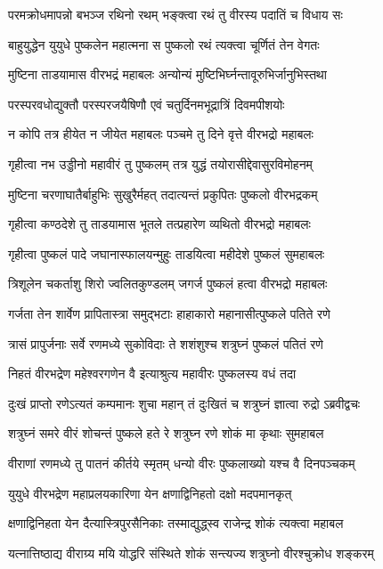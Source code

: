 \twolineshloka
{परमक्रोधमापन्नो बभञ्ज रथिनो रथम्}
{भङ्क्त्वा रथं तु वीरस्य पदातिं च विधाय सः}%

\twolineshloka
{बाहुयुद्धेन युयुधे पुष्कलेन महात्मना}
{स पुष्कलो रथं त्यक्त्वा चूर्णितं तेन वेगतः}%

\twolineshloka
{मुष्टिना ताडयामास वीरभद्रं महाबलः}
{अन्योन्यं मुष्टिभिर्घ्नन्तावूरुभिर्जानुभिस्तथा}%

\twolineshloka
{परस्परवधोद्युक्तौ परस्परजयैषिणौ}
{एवं चतुर्दिनमभूद्रात्रिं दिवमपीशयोः}%

\twolineshloka
{न कोपि तत्र हीयेत न जीयेत महाबलः}
{पञ्चमे तु दिने वृत्ते वीरभद्रो महाबलः}%

\twolineshloka
{गृहीत्वा नभ उड्डीनो महावीरं तु पुष्कलम्}
{तत्र युद्धं तयोरासीद्देवासुरविमोहनम्}%

\twolineshloka
{मुष्टिना चरणाघातैर्बाहुभिः सुखुरैर्महत्}
{तदात्यन्तं प्रकुपितः पुष्कलो वीरभद्रकम्}%

\twolineshloka
{गृहीत्वा कण्ठदेशे तु ताडयामास भूतले}
{तत्प्रहारेण व्यथितो वीरभद्रो महाबलः}%

\twolineshloka
{गृहीत्वा पुष्कलं पादे जघानास्फालयन्मुहुः}
{ताडयित्वा महीदेशे पुष्कलं सुमहाबलः}%

\twolineshloka
{त्रिशूलेन चकर्ताशु शिरो ज्वलितकुण्डलम्}
{जगर्ज पुष्कलं हत्वा वीरभद्रो महाबलः}%

\twolineshloka
{गर्जता तेन शार्वेण प्रापितास्त्रा समुद्भटाः}
{हाहाकारो महानासीत्पुष्कले पतिते रणे}%

\twolineshloka
{त्रासं प्रापुर्जनाः सर्वे रणमध्ये सुकोविदाः}
{ते शशंशुश्च शत्रुघ्नं पुष्कलं पतितं रणे}%

\twolineshloka
{निहतं वीरभद्रेण महेश्वरगणेन वै}
{इत्याश्रुत्य महावीरः पुष्कलस्य वधं तदा}%

\twolineshloka
{दुःखं प्राप्तो रणेऽत्यतं कम्पमानः शुचा महान्}
{तं दुःखितं च शत्रुघ्नं ज्ञात्वा रुद्रो ऽब्रवीद्वचः}%

\twolineshloka
{शत्रुघ्नं समरे वीरं शोचन्तं पुष्कले हते}
{रे शत्रुघ्न रणे शोकं मा कृथाः सुमहाबल}%

\twolineshloka
{वीराणां रणमध्ये तु पातनं कीर्तये स्मृतम्}
{धन्यो वीरः पुष्कलाख्यो यश्च वै दिनपञ्चकम्}%

\twolineshloka
{युयुधे वीरभद्रेण महाप्रलयकारिणा}
{येन क्षणाद्विनिहतो दक्षो मदपमानकृत्}%

\twolineshloka
{क्षणाद्विनिहता येन दैत्यास्त्रिपुरसैनिकाः}
{तस्माद्युद्ध्स्व राजेन्द्र शोकं त्यक्त्वा महाबल}%

\twolineshloka
{यत्नात्तिष्ठाद्य वीराग्र्य मयि योद्धरि संस्थिते}
{शोकं सन्त्यज्य शत्रुघ्नो वीरश्चुक्रोध शङ्करम्}%

